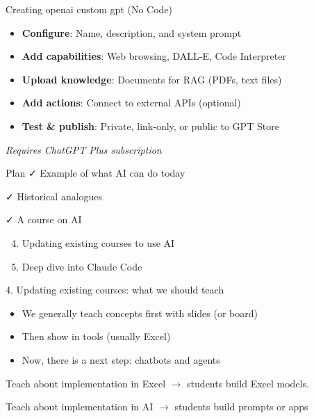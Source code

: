 \documentclass[
  ignorenonframetext,
]{beamer}
\providecommand{\tightlist}{%
  \setlength{\itemsep}{0pt}\setlength{\parskip}{0pt}}\usepackage{longtable,booktabs,array}
\begin{document}
\begin{frame}{Creating openai custom gpt (No Code)}
\label{creating-openai-custom-gpt-no-code}
\begin{itemize}
\tightlist
\item
  \textbf{Configure}: Name, description, and system prompt
\item
  \textbf{Add capabilities}: Web browsing, DALL-E, Code Interpreter
\item
  \textbf{Upload knowledge}: Documents for RAG (PDFs, text files)
\item
  \textbf{Add actions}: Connect to external APIs (optional)
\item
  \textbf{Test \& publish}: Private, link-only, or public to GPT Store
\end{itemize}

\emph{Requires ChatGPT Plus subscription}
\end{frame}

\begin{frame}{Plan}
\label{plan-2}
✓ Example of what AI can do today

✓ Historical analogues

✓ A course on AI

\begin{enumerate}
\setcounter{enumi}{3}
\item
  Updating existing courses to use AI
\item
  Deep dive into Claude Code
\end{enumerate}
\end{frame}

\begin{frame}{4. Updating existing courses: what we should teach}
\label{updating-existing-courses-what-we-should-teach}
\begin{itemize}
\tightlist
\item
  We generally teach concepts first with slides (or board)
\item
  Then show in tools (usually Excel)
\item
  Now, there is a next step: chatbots and agents
\end{itemize}

Teach about implementation in Excel \(\rightarrow\) students build Excel
models.

Teach about implementation in AI \(\rightarrow\) students build prompts
or apps
\end{frame}
\end{document}
